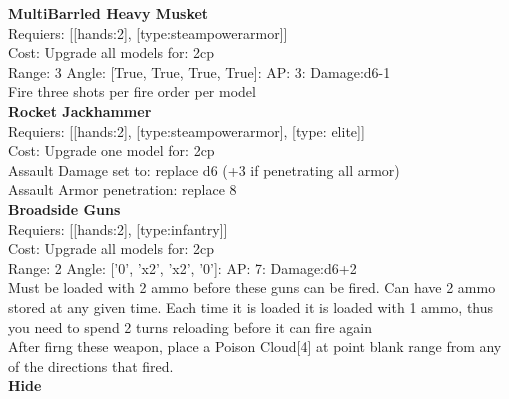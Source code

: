 {\bf MultiBarrled Heavy Musket } \\

Requiers: [[hands:2], [type:steampowerarmor]] \\
Cost: Upgrade all models for: 2cp \\


Range: 3  Angle: [True, True, True, True]: AP: 3: Damage:d6-1 \\
Fire three shots per fire order per model\\ 






{\bf Rocket Jackhammer } \\

Requiers: [[hands:2], [type:steampowerarmor], [type: elite]] \\
Cost: Upgrade one model for: 2cp \\





Assault Damage set to: replace d6 (+3 if penetrating all armor)
\\ 
Assault Armor penetration: replace 8 
\\ 


{\bf Broadside Guns } \\

Requiers: [[hands:2], [type:infantry]] \\
Cost: Upgrade all models for: 2cp \\


Range: 2  Angle: ['0', 'x2', 'x2', '0']: AP: 7: Damage:d6+2 \\
Must be loaded with 2 ammo before these guns can be fired. Can have 2 ammo stored at any given time. Each time it is loaded it is loaded with 1 ammo, thus you need to spend 2 turns reloading before it can fire again\\ 
After firng these weapon, place a Poison Cloud[4] at point blank range from any of the directions that fired.\\ 






{\bf Hide } \\

